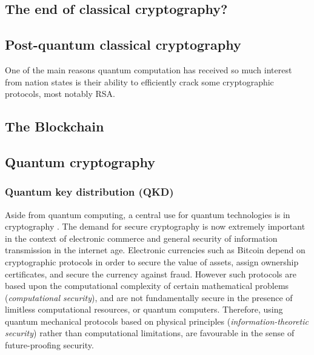 \subsection{The end of classical cryptography?}

\subsection{Post-quantum classical cryptography}

One of the main reasons quantum computation has received so much interest from nation states is their ability to efficiently crack some cryptographic protocols, most notably RSA.


\subsection{The Blockchain}

%
%

\subsection{Quantum cryptography}

%
%

\subsubsection{Quantum key distribution (QKD)} \label{sec:QKD} 

Aside from quantum computing, a central use for quantum technologies is in cryptography \cite{bib:Gisin02}. The demand for secure cryptography is now extremely important in the context of electronic commerce and general security of information transmission in the internet age. Electronic currencies such as Bitcoin depend on cryptographic protocols in order to secure the value of assets, assign ownership certificates, and secure the currency against fraud. However such protocols are based upon the computational complexity of certain mathematical problems (\textit{computational security}), and are not fundamentally secure in the presence of limitless computational resources, or quantum computers. Therefore, using quantum mechanical protocols based on physical principles (\textit{information-theoretic security}) rather than computational limitations, are favourable in the sense of future-proofing security.

